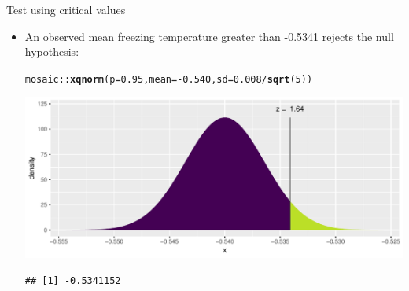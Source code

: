 \documentclass{beamer}\usepackage[]{graphicx}\usepackage[]{color}
\newcommand{\hlnum}[1]{\textcolor[rgb]{0.686,0.059,0.569}{#1}}%
\newcommand{\hlopt}[1]{\textcolor[rgb]{0,0,0}{#1}}%
\newcommand{\hlstd}[1]{\textcolor[rgb]{0.345,0.345,0.345}{#1}}%
\newcommand{\hlkwc}[1]{\textcolor[rgb]{0.333,0.667,0.333}{#1}}%
\newcommand{\hlkwd}[1]{\textcolor[rgb]{0.737,0.353,0.396}{\textbf{#1}}}%
\newenvironment{knitrout}{}{} %
\begin{document}
\begin{frame}[fragile]{Test using critical values}
\begin{itemize}

	\item An observed mean freezing temperature greater than -0.5341 rejects the null hypothesis:
	
\begin{knitrout}\scriptsize
{}\color{fgcolor}
\begin{alltt}
\hlstd{mosaic}\hlopt{::}\hlkwd{xqnorm}\hlstd{(}\hlkwc{p} \hlstd{=} \hlnum{0.95}\hlstd{,} \hlkwc{mean} \hlstd{=} \hlopt{-}\hlnum{0.540}\hlstd{,} \hlkwc{sd} \hlstd{=} \hlnum{0.008}\hlopt{/}\hlkwd{sqrt}\hlstd{(}\hlnum{5}\hlstd{))}
\end{alltt}


{\ttfamily\noindent\itshape\color{messagecolor}{\#\# }}

{\ttfamily\noindent\itshape{}}

{\ttfamily\noindent\itshape\color{messagecolor}{\#\# 	P(X <= -0.5341152) = 0.95}}

{\ttfamily\noindent\itshape\color{messagecolor}{\#\# 	P(X >\ \ -0.5341152) = 0.05}}

{\ttfamily\noindent\itshape\color{messagecolor}{\#\# }}

{\centering \includegraphics[width=1\linewidth]{figure/unnamed-chunk-3-1} 

}


\begin{verbatim}
## [1] -0.5341152
\end{verbatim}

\end{knitrout}

	
\end{itemize}
\end{frame}
\end{document}
